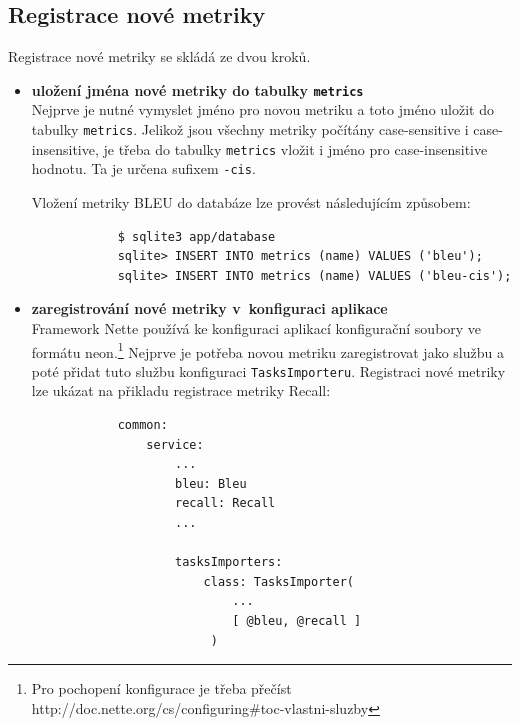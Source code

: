 \subsection{Registrace nové metriky}
Registrace nové metriky se skládá ze dvou kroků.
\begin{itemize}
	\item \textbf{uložení jména nové metriky do tabulky \texttt{metrics}} \\
		Nejprve je nutné vymyslet jméno pro novou metriku a toto jméno uložit do tabulky \texttt{metrics}. 
		Jelikož jsou všechny metriky počítány \mbox{case-sensitive} i \mbox{case-insensitive},
		  je třeba do tabulky \texttt{metrics} vložit i jméno pro \mbox{case-insensitive} hodnotu. 
		Ta je určena sufixem \texttt{-cis}.

		Vložení metriky BLEU do databáze lze provést následujícím způsobem:
		\begin{verbatim}
			$ sqlite3 app/database
			sqlite> INSERT INTO metrics (name) VALUES ('bleu');
			sqlite> INSERT INTO metrics (name) VALUES ('bleu-cis');
		\end{verbatim}

	\item \textbf{zaregistrování nové metriky v~konfiguraci aplikace} \\
		Framework Nette používá ke konfiguraci aplikací konfigurační soubory ve formátu neon.\footnote{
			Pro pochopení konfigurace je třeba přečíst http://doc.nette.org/cs/configuring\#toc-vlastni-sluzby
		}
		Nejprve je potřeba novou metriku zaregistrovat jako službu a poté přidat tuto službu konfiguraci \texttt{TasksImporteru}.
		Registraci nové metriky lze ukázat na přikladu registrace metriky Recall:


		\begin{verbatim}
			common:
			    service:
			        ...
			        bleu: Bleu
			        recall: Recall 
			        ...

			        tasksImporters:
			            class: TasksImporter(
			                ...
			                [ @bleu, @recall ]
			             )
		\end{verbatim}
\end{itemize}
